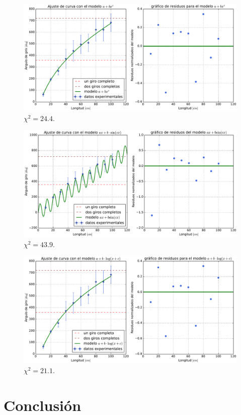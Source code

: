 \documentclass{article}
\begin{document}
\begin{figure}[ht]
    \centering
    \includegraphics[scale=0.5]{Informe/img/grafico-modelo-axb.pdf}
    \caption{$\chi^{2} = 24.4$.}
    \label{fig:axb}
\end{figure}

\begin{figure}[ht]
    \centering
    \includegraphics[scale=0.5]{Informe/img/grafico-modelo-asinb.pdf}
    \caption{$\chi^{2} = 43.9$.}
    \label{fig:asinb}
\end{figure}

\begin{figure}[ht]
    \centering
    \includegraphics[scale=0.5]{Informe/img/grafico-modelo-alogb.pdf}
    \caption{$\chi^{2} = 21.1$.}
    \label{fig:alogb}
\end{figure}

\section{Conclusión}




\end{document}
